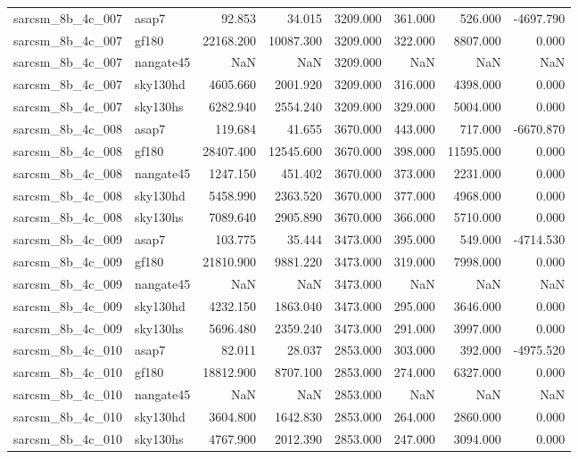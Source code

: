 \begin{tabular}{llrrrrrr}
sarcsm\_8b\_4c\_007 & asap7 & 92.853 & 34.015 & 3209.000 & 361.000 & 526.000 & -4697.790 \\
sarcsm\_8b\_4c\_007 & gf180 & 22168.200 & 10087.300 & 3209.000 & 322.000 & 8807.000 & 0.000 \\
sarcsm\_8b\_4c\_007 & nangate45 & NaN & NaN & 3209.000 & NaN & NaN & NaN \\
sarcsm\_8b\_4c\_007 & sky130hd & 4605.660 & 2001.920 & 3209.000 & 316.000 & 4398.000 & 0.000 \\
sarcsm\_8b\_4c\_007 & sky130hs & 6282.940 & 2554.240 & 3209.000 & 329.000 & 5004.000 & 0.000 \\
sarcsm\_8b\_4c\_008 & asap7 & 119.684 & 41.655 & 3670.000 & 443.000 & 717.000 & -6670.870 \\
sarcsm\_8b\_4c\_008 & gf180 & 28407.400 & 12545.600 & 3670.000 & 398.000 & 11595.000 & 0.000 \\
sarcsm\_8b\_4c\_008 & nangate45 & 1247.150 & 451.402 & 3670.000 & 373.000 & 2231.000 & 0.000 \\
sarcsm\_8b\_4c\_008 & sky130hd & 5458.990 & 2363.520 & 3670.000 & 377.000 & 4968.000 & 0.000 \\
sarcsm\_8b\_4c\_008 & sky130hs & 7089.640 & 2905.890 & 3670.000 & 366.000 & 5710.000 & 0.000 \\
sarcsm\_8b\_4c\_009 & asap7 & 103.775 & 35.444 & 3473.000 & 395.000 & 549.000 & -4714.530 \\
sarcsm\_8b\_4c\_009 & gf180 & 21810.900 & 9881.220 & 3473.000 & 319.000 & 7998.000 & 0.000 \\
sarcsm\_8b\_4c\_009 & nangate45 & NaN & NaN & 3473.000 & NaN & NaN & NaN \\
sarcsm\_8b\_4c\_009 & sky130hd & 4232.150 & 1863.040 & 3473.000 & 295.000 & 3646.000 & 0.000 \\
sarcsm\_8b\_4c\_009 & sky130hs & 5696.480 & 2359.240 & 3473.000 & 291.000 & 3997.000 & 0.000 \\
sarcsm\_8b\_4c\_010 & asap7 & 82.011 & 28.037 & 2853.000 & 303.000 & 392.000 & -4975.520 \\
sarcsm\_8b\_4c\_010 & gf180 & 18812.900 & 8707.100 & 2853.000 & 274.000 & 6327.000 & 0.000 \\
sarcsm\_8b\_4c\_010 & nangate45 & NaN & NaN & 2853.000 & NaN & NaN & NaN \\
sarcsm\_8b\_4c\_010 & sky130hd & 3604.800 & 1642.830 & 2853.000 & 264.000 & 2860.000 & 0.000 \\
sarcsm\_8b\_4c\_010 & sky130hs & 4767.900 & 2012.390 & 2853.000 & 247.000 & 3094.000 & 0.000 \\

\end{tabular}
